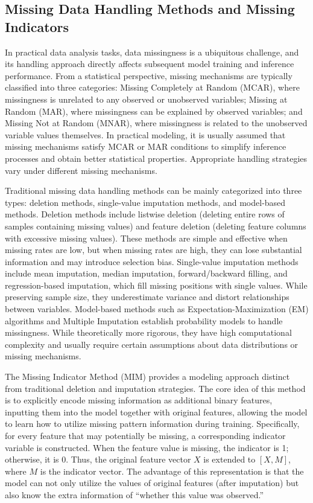 \documentclass[10pt,a4paper]{article}
\begin{document}
\subsection{Missing Data Handling Methods and Missing Indicators}

In practical data analysis tasks, data missingness is a ubiquitous challenge, and its handling approach directly affects subsequent model training and inference performance. From a statistical perspective, missing mechanisms are typically classified into three categories: Missing Completely at Random (MCAR), where missingness is unrelated to any observed or unobserved variables; Missing at Random (MAR), where missingness can be explained by observed variables; and Missing Not at Random (MNAR), where missingness is related to the unobserved variable values themselves\cite{little2002statistical}. In practical modeling, it is usually assumed that missing mechanisms satisfy MCAR or MAR conditions to simplify inference processes and obtain better statistical properties\cite{little2002statistical}. Appropriate handling strategies vary under different missing mechanisms.

Traditional missing data handling methods can be mainly categorized into three types: deletion methods, single-value imputation methods, and model-based methods. Deletion methods include listwise deletion (deleting entire rows of samples containing missing values) and feature deletion (deleting feature columns with excessive missing values). These methods are simple and effective when missing rates are low, but when missing rates are high, they can lose substantial information and may introduce selection bias. Single-value imputation methods include mean imputation, median imputation, forward/backward filling, and regression-based imputation, which fill missing positions with single values. While preserving sample size, they underestimate variance and distort relationships between variables. Model-based methods such as Expectation-Maximization (EM) algorithms and Multiple Imputation establish probability models to handle missingness. While theoretically more rigorous, they have high computational complexity and usually require certain assumptions about data distributions or missing mechanisms.

The Missing Indicator Method (MIM) provides a modeling approach distinct from traditional deletion and imputation strategies\cite{jones1996indicator,van2023missing}. The core idea of this method is to explicitly encode missing information as additional binary features, inputting them into the model together with original features, allowing the model to learn how to utilize missing pattern information during training\cite{ipsen2022deal}. Specifically, for every feature that may potentially be missing, a corresponding indicator variable is constructed. When the feature value is missing, the indicator is 1; otherwise, it is 0. Thus, the original feature vector $X$ is extended to $[X, M]$, where $M$ is the indicator vector. The advantage of this representation is that the model can not only utilize the values of original features (after imputation) but also know the extra information of ``whether this value was observed.''
\end{document}
